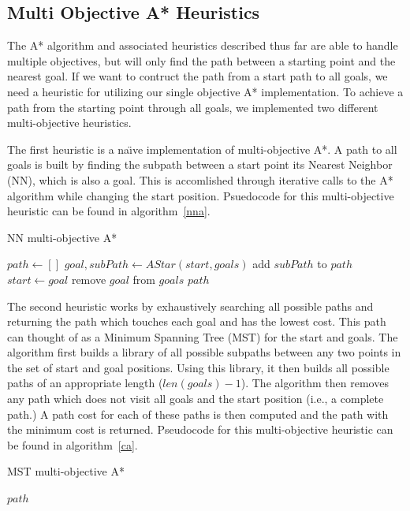 \documentclass[12pt, conference, compsocconf]{IEEEtran}
\begin{document}
\subsection{Multi Objective A* Heuristics}
The A* algorithm and associated heuristics described thus far are able to
handle multiple objectives, but will only find the path between a starting
point and the nearest goal. If we want to contruct the path from a start path
to all goals, we need a heuristic for utilizing our single objective A*
implementation.  To achieve a path from the starting point through all goals,
we implemented two different multi-objective heuristics.

The first heuristic is a na\"{\i}ve implementation of multi-objective A*.  A
path to all goals is built by finding the subpath between a start point its
Nearest Neighbor (NN), which is also a goal.  This is accomlished through
iterative calls to the A* algorithm while changing the start position.
Psuedocode for this multi-objective heuristic can be found in
algorithm~\ref{nna}.

\begin{algorithm}
    \caption{NN multi-objective A*}
    \label{nna}
    \begin{algorithmic}[1]
        \State $path\gets []$
        \State $goal, subPath\gets AStar(start, goals)$
        \State add $subPath$ to $path$
        \State $start\gets goal$
        \State remove $goal$ from $goals$
        \EndWhile
        \Return $path$
        \EndProcedure
    \end{algorithmic}
\end{algorithm}

The second heuristic works by exhaustively searching all possible paths and
returning the path which touches each goal and has the lowest cost.  This path
can thought of as a Minimum Spanning Tree (MST) for the start and goals.  The
algorithm first builds a library of all possible subpaths between any two
points in the set of start and goal positions.  Using this library, it then
builds all possible paths of an appropriate length ($len(goals)-1$).  The
algorithm then removes any path which does not visit all goals and the start
position (i.e., a complete path.)  A path cost for each of these paths is then
computed and the path with the minimum cost is returned.  Pseudocode for this
multi-objective heuristic can be found in algorithm~\ref{ca}.

\begin{algorithm}
    \caption{MST multi-objective A*}
    \label{ca}
    \begin{algorithmic}[1]
        \Return $path$
        \EndProcedure
    \end{algorithmic}
\end{algorithm}
\end{document}
